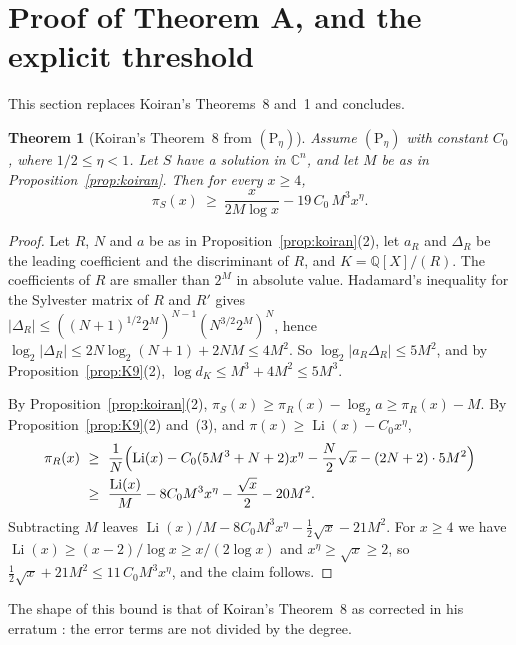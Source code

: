 \documentclass[11pt]{amsart}
\newtheorem{thm}{Theorem}[section]
\theoremstyle{definition}
\theoremstyle{remark}
\newcommand{\Q}{\mathbb Q}
\newcommand{\C}{\mathbb C}
\newcommand{\Ph}[1]{(\mathrm P_{#1})}
\newcommand{\Li}{\operatorname{Li}}
\begin{document}
\section{Proof of Theorem A, and the explicit threshold}\label{sec:proofA}
This section replaces Koiran's Theorems~8 and~1 and concludes.

\begin{thm}[Koiran's Theorem~8 from $\Ph\eta$]\label{thm:K8}
Assume $\Ph\eta$ with constant $C_0$, where $1/2\le\eta<1$. Let $S$ have a solution in $\C^n$, and let $M$ be as in Proposition~\ref{prop:koiran}. Then for every $x\ge4$,
\[
 \pi_S(x)\ \ge\ \frac{x}{2M\log x}-19\,C_0\,M^3x^{\eta}.
\]
\end{thm}

\begin{proof}
Let $R$, $N$ and $a$ be as in Proposition~\ref{prop:koiran}(2), let $a_R$ and $\Delta_R$ be the leading coefficient and the discriminant of $R$, and $K=\Q[X]/(R)$. The coefficients of $R$ are smaller than $2^M$ in absolute value. Hadamard's inequality for the Sylvester matrix of $R$ and $R'$ gives $|\Delta_R|\le((N+1)^{1/2}2^M)^{N-1}(N^{3/2}2^M)^{N}$, hence $\log_2|\Delta_R|\le2N\log_2(N+1)+2NM\le4M^2$. So $\log_2|a_R\Delta_R|\le5M^2$, and by Proposition~\ref{prop:K9}(2), $\log d_K\le M^3+4M^2\le5M^3$.

By Proposition~\ref{prop:koiran}(2), $\pi_S(x)\ge\pi_R(x)-\log_2a\ge\pi_R(x)-M$. By Proposition~\ref{prop:K9}(2) and~(3), and $\pi(x)\ge\Li(x)-C_0x^\eta$,
\begin{align*}
 \pi_R(x)&\ \ge\ \frac1N\Bigl(\Li(x)-C_0(5M^3+N+2)x^\eta-\frac N2\sqrt x-(2N+2)\cdot5M^2\Bigr)\\
 &\ \ge\ \frac{\Li(x)}{M}-8C_0M^3x^\eta-\frac{\sqrt x}2-20M^2 .
\end{align*}
Subtracting $M$ leaves $\Li(x)/M-8C_0M^3x^\eta-\frac12\sqrt x-21M^2$. For $x\ge4$ we have $\Li(x)\ge(x-2)/\log x\ge x/(2\log x)$ and $x^\eta\ge\sqrt x\ge2$, so $\frac12\sqrt x+21M^2\le11\,C_0M^3x^\eta$, and the claim follows.
\end{proof}

The shape of this bound is that of Koiran's Theorem~8 as corrected in his erratum \cite{K97e}: the error terms are not divided by the degree.
\end{document}
